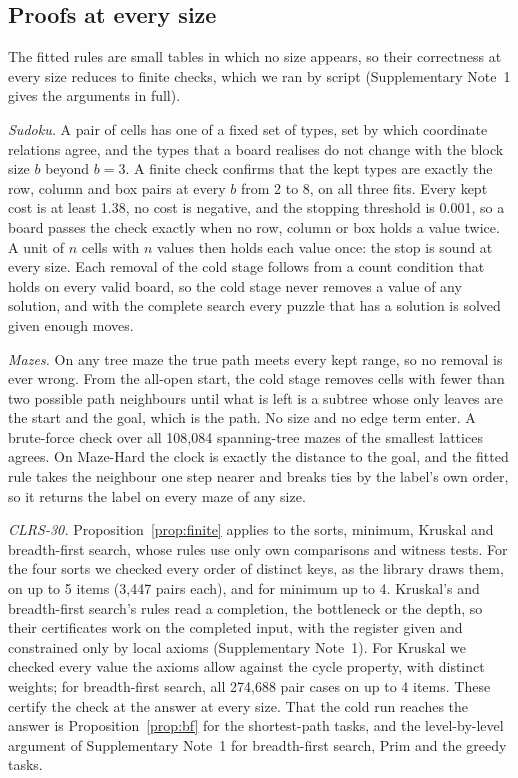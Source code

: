 \documentclass[10pt]{article}
\begin{document}
\subsection{Proofs at every size}\label{sec:proofs}

The fitted rules are small tables in which no size appears, so their correctness at every size reduces to finite
checks, which we ran by script (Supplementary Note~1 gives the arguments in full).

\emph{Sudoku.} A pair of cells has one of a fixed set of types, set by which coordinate relations agree, and the types
that a board realises do not change with the block size $b$ beyond $b=3$. A finite check confirms that the kept types
are exactly the row, column and box pairs at every $b$ from 2 to 8, on all three fits. Every
kept cost is at least 1.38, no cost is negative, and the stopping threshold is 0.001, so a board
passes the check exactly when no row, column or box holds a value twice. A unit of $n$ cells with $n$ values then holds
each value once: the stop is sound at every size. Each removal of the cold stage follows from a count condition that
holds on every valid board, so the cold stage never removes a value of any solution, and with the complete search every
puzzle that has a solution is solved given enough moves.

\emph{Mazes.} On any tree maze the true path meets every kept range, so no removal is ever wrong. From the all-open
start, the cold stage removes cells with fewer than two possible path neighbours until what is left is a subtree whose
only leaves are the start and the goal, which is the path. No size and no edge term enter. A brute-force check over all
108,084 spanning-tree mazes of the smallest lattices agrees. On Maze-Hard the clock is exactly the distance to
the goal, and the fitted rule takes the neighbour one step nearer and breaks ties by the label's own order, so it
returns the label on every maze of any size.

\emph{CLRS-30.} Proposition~\ref{prop:finite} applies to the sorts, minimum, Kruskal and breadth-first search, whose
rules use only own comparisons and witness tests. For the four sorts we checked every order of distinct keys, as the
library draws them, on up to 5 items (3,447 pairs each), and for minimum up to
4. Kruskal's and breadth-first search's rules read a completion, the bottleneck or the depth, so their
certificates work on the completed input, with the register given and constrained only by local axioms (Supplementary
Note~1). For Kruskal we checked every value the axioms allow against the cycle property, with distinct weights; for
breadth-first search, all 274,688 pair cases on up to 4 items. These certify the check at
the answer at every size. That the cold run reaches the answer is Proposition~\ref{prop:bf} for the shortest-path tasks,
and the level-by-level argument of Supplementary Note~1 for breadth-first search, Prim and the greedy tasks.
\end{document}
